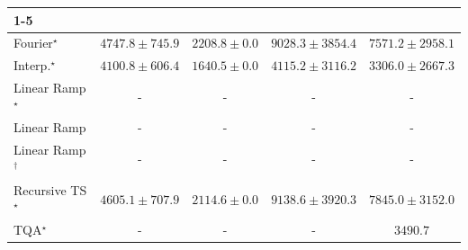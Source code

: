 \begin{tabular}{l|cccc|}
\cline{1-5}
\multicolumn{5}{c}{\rule{0pt}{8pt}SV} \\
\midrule
Fourier$^\star$ & {\cellcolor[HTML]{96B6D7}} \color[HTML]{000000} $4747.8\pm 745.9$ & {\cellcolor[HTML]{F4EDF6}} \color[HTML]{000000} $2208.8\pm 0.0$ & {\cellcolor[HTML]{023B5D}} \color[HTML]{F1F1F1} $9028.3\pm 3854.4$ & {\cellcolor[HTML]{0569A4}} \color[HTML]{F1F1F1} $7571.2\pm 2958.1$ \\
Interp.$^\star$ & {\cellcolor[HTML]{B7C5DF}} \color[HTML]{000000} $4100.8\pm 606.4$ & {\cellcolor[HTML]{FFF7FB}} \color[HTML]{000000} $1640.5\pm 0.0$ & {\cellcolor[HTML]{B5C4DF}} \color[HTML]{000000} $4115.2\pm 3116.2$ & {\cellcolor[HTML]{D7D6E9}} \color[HTML]{000000} $3306.0\pm 2667.3$ \\
Linear Ramp$^\star$ & {\cellcolor[HTML]{000000}} \color[HTML]{F1F1F1} {\cellcolor{white}} \color{black} - & {\cellcolor[HTML]{000000}} \color[HTML]{F1F1F1} {\cellcolor{white}} \color{black} - & {\cellcolor[HTML]{000000}} \color[HTML]{F1F1F1} {\cellcolor{white}} \color{black} - & {\cellcolor[HTML]{000000}} \color[HTML]{F1F1F1} {\cellcolor{white}} \color{black} - \\
Linear Ramp & {\cellcolor[HTML]{000000}} \color[HTML]{F1F1F1} {\cellcolor{white}} \color{black} - & {\cellcolor[HTML]{000000}} \color[HTML]{F1F1F1} {\cellcolor{white}} \color{black} - & {\cellcolor[HTML]{000000}} \color[HTML]{F1F1F1} {\cellcolor{white}} \color{black} - & {\cellcolor[HTML]{000000}} \color[HTML]{F1F1F1} {\cellcolor{white}} \color{black} - \\
Linear Ramp$^\dagger$ & {\cellcolor[HTML]{000000}} \color[HTML]{F1F1F1} {\cellcolor{white}} \color{black} - & {\cellcolor[HTML]{000000}} \color[HTML]{F1F1F1} {\cellcolor{white}} \color{black} - & {\cellcolor[HTML]{000000}} \color[HTML]{F1F1F1} {\cellcolor{white}} \color{black} - & {\cellcolor[HTML]{000000}} \color[HTML]{F1F1F1} {\cellcolor{white}} \color{black} - \\
Recursive TS$^\star$ & {\cellcolor[HTML]{9EBAD9}} \color[HTML]{000000} $4605.1\pm 707.9$ & {\cellcolor[HTML]{F5EFF6}} \color[HTML]{000000} $2114.6\pm 0.0$ & {\cellcolor[HTML]{023858}} \color[HTML]{F1F1F1} $9138.6\pm 3920.3$ & {\cellcolor[HTML]{04629A}} \color[HTML]{F1F1F1} $7845.0\pm 3152.0$ \\
TQA$^\star$ & {\cellcolor[HTML]{000000}} \color[HTML]{F1F1F1} {\cellcolor{white}} \color{black} - & {\cellcolor[HTML]{000000}} \color[HTML]{F1F1F1} {\cellcolor{white}} \color{black} - & {\cellcolor[HTML]{000000}} \color[HTML]{F1F1F1} {\cellcolor{white}} \color{black} - & {\cellcolor[HTML]{D1D2E6}} \color[HTML]{000000} $3490.7$ \\

\end{tabular}
